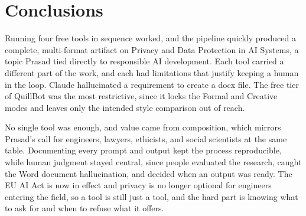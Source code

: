 \section{Conclusions}

Running four free tools in sequence worked,
and the pipeline quickly produced a complete,
multi-format artifact on Privacy and Data
Protection in AI Systems, a topic Prasad tied
directly to responsible AI development. Each
tool carried a different part of the work, and each
had limitations that justify keeping a human in the
loop. Claude hallucinated a requirement to create a
docx file. The free tier of QuillBot
was the most restrictive, since it locks the
Formal and Creative modes and leaves only the
intended style comparison out of reach.

No single tool was enough, and value came from
composition, which mirrors Prasad's call for
engineers, lawyers, ethicists, and social
scientists at the same table. Documenting
every prompt and output kept the process
reproducible, while human judgment stayed
central, since people evaluated the research,
caught the Word document hallucination, and
decided when an output was ready. The EU AI
Act is now in effect and privacy is no longer
optional for engineers entering the field, so
a tool is still just a tool, and the hard part
is knowing what to ask for and when to refuse
what it offers.
